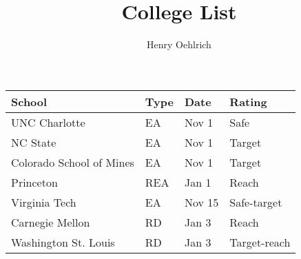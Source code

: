 \documentclass{article}
\title{College List}
\author{Henry Oehlrich}
\begin{document}
\maketitle
\centering
\begin{tabular}{p{5cm}p{1cm}p{1.5cm}p{2.5cm}}
    \toprule
    School & Type & Date & Rating \\
    \midrule
    UNC Charlotte & EA & Nov 1 & Safe \\
    NC State & EA & Nov 1 & Target \\
    Colorado School of Mines & EA & Nov 1 & Target \\
    Princeton & REA & Jan 1 & Reach \\
    Virginia Tech & EA & Nov 15 & Safe-target \\
    Carnegie Mellon & RD & Jan 3 & Reach \\
    Washington St. Louis & RD & Jan 3 & Target-reach \\
    \bottomrule
\end{tabular}
\end{document}
